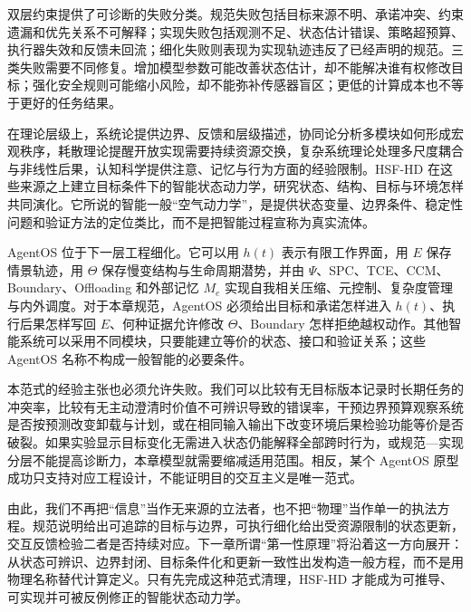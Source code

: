 双层约束提供了可诊断的失败分类。规范失败包括目标来源不明、承诺冲突、约束遗漏和优先关系不可解释；实现失败包括观测不足、状态估计错误、策略超预算、执行器失效和反馈未回流；细化失败则表现为实现轨迹违反了已经声明的规范。三类失败需要不同修复。增加模型参数可能改善状态估计，却不能解决谁有权修改目标；强化安全规则可能缩小风险，却不能弥补传感器盲区；更低的计算成本也不等于更好的任务结果。

在理论层级上，系统论提供边界、反馈和层级描述，协同论分析多模块如何形成宏观秩序，耗散理论提醒开放实现需要持续资源交换，复杂系统理论处理多尺度耦合与非线性后果，认知科学提供注意、记忆与行为方面的经验限制。HSF-HD 在这些来源之上建立目标条件下的智能状态动力学，研究状态、结构、目标与环境怎样共同演化。它所说的智能一般“空气动力学”，是提供状态变量、边界条件、稳定性问题和验证方法的定位类比，而不是把智能过程宣称为真实流体。

AgentOS 位于下一层工程细化。它可以用 $h(t)$ 表示有限工作界面，用 $E$ 保存情景轨迹，用 $\Theta$ 保存慢变结构与生命周期潜势，并由 $\Psi$、SPC、TCE、CCM、Boundary、Offloading 和外部记忆 $M_e$ 实现自我相关压缩、元控制、复杂度管理与内外调度。对于本章规范，AgentOS 必须给出目标和承诺怎样进入 $h(t)$、执行后果怎样写回 $E$、何种证据允许修改 $\Theta$、Boundary 怎样拒绝越权动作。其他智能系统可以采用不同模块，只要能建立等价的状态、接口和验证关系；这些 AgentOS 名称不构成一般智能的必要条件。

本范式的经验主张也必须允许失败。我们可以比较有无目标版本记录时长期任务的冲突率，比较有无主动澄清时价值不可辨识导致的错误率，干预边界预算观察系统是否按预测改变卸载与计划，或在相同输入输出下改变环境后果检验功能等价是否破裂。如果实验显示目标变化无需进入状态仍能解释全部跨时行为，或规范—实现分层不能提高诊断力，本章模型就需要缩减适用范围。相反，某个 AgentOS 原型成功只支持对应工程设计，不能证明目的交互主义是唯一范式。

由此，我们不再把“信息”当作无来源的立法者，也不把“物理”当作单一的执法方程。规范说明给出可追踪的目标与边界，可执行细化给出受资源限制的状态更新，交互反馈检验二者是否持续对应。下一章所谓“第一性原理”将沿着这一方向展开：从状态可辨识、边界封闭、目标条件化和更新一致性出发构造一般方程，而不是用物理名称替代计算定义。只有先完成这种范式清理，HSF-HD 才能成为可推导、可实现并可被反例修正的智能状态动力学。
